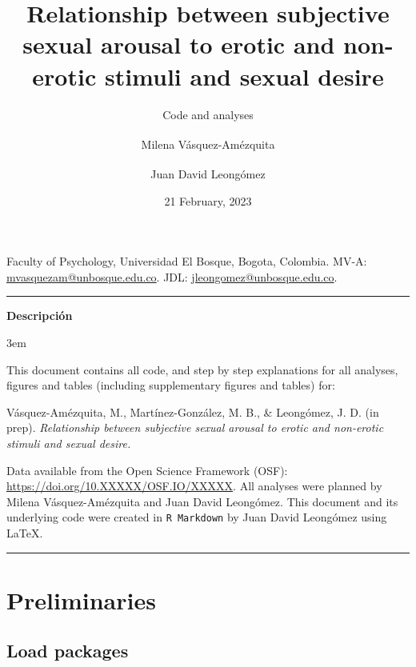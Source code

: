 \documentclass[
  bookmarksnumbered]{article}
\title{Relationship between subjective sexual arousal to erotic and non-erotic stimuli and sexual desire}
\subtitle{Code and analyses}
\author{Milena Vásquez-Amézquita \orcidlink{0000-0001-7317-8430}\textsuperscript{} \and Juan David Leongómez \orcidlink{0000-0002-0092-6298}\textsuperscript{}}
\date{21 February, 2023}
\begin{document}
\maketitle

\begin{center}
Faculty of Psychology, Universidad El Bosque, Bogota, Colombia. \linebreak
MV-A: \href{mailto:mvasquezam@unbosque.edu.co}{mvasquezam@unbosque.edu.co}. 
JDL: \href{mailto:jleongomez@unbosque.edu.co}{jleongomez@unbosque.edu.co}.

\begin{center}\rule{0.5\linewidth}{0.5pt}\end{center}

\textbf{Descripción}
\end{center}

\par
\begingroup
\leftskip3em
\rightskip\leftskip

This document contains all code, and step by step explanations for all analyses, figures and tables (including supplementary figures and tables) for:

\begin{hangparas}{.25in}{1}
Vásquez-Amézquita, M., Martínez-González, M. B., \& Leongómez, J. D. (in prep). \textit{Relationship between subjective sexual arousal to erotic and non-erotic stimuli and sexual desire.}
\end{hangparas}

Data available from the Open Science Framework (OSF): \url{https://doi.org/10.XXXXX/OSF.IO/XXXXX}. All analyses were planned by Milena Vásquez-Amézquita and Juan David Leongómez. This document and its underlying code were created in \texttt{R\ Markdown} by Juan David Leongómez using \LaTeX.

\begin{center}\rule{0.5\linewidth}{0.5pt}\end{center}

\par
\endgroup

{\hypersetup{hidelinks}
\setcounter{tocdepth}{6}
\tableofcontents
}
\opensupplement

\newpage

\hypertarget{preliminaries}{%
\section{Preliminaries}\label{preliminaries}}

\hypertarget{load-packages}{%
\subsection{Load packages}\label{load-packages}}
\end{document}
